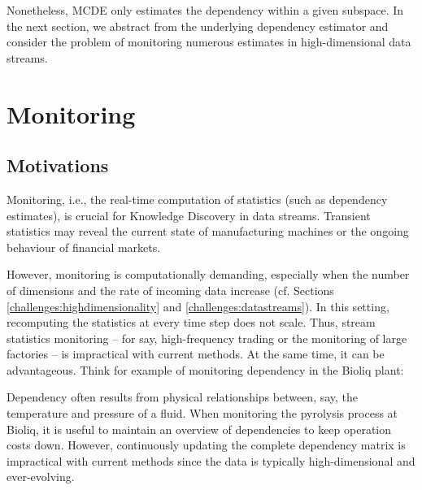 Nonetheless, \gls{MCDE} only estimates the dependency within a given subspace. In the next section, we abstract from the underlying dependency estimator and consider the problem of monitoring numerous estimates in high-dimensional data streams. 

\section{Monitoring}

\subsection{Motivations} 

Monitoring, i.e., the real-time computation of statistics (such as dependency estimates), is crucial for Knowledge Discovery in data streams. Transient statistics may reveal the
current state of manufacturing machines or the ongoing behaviour of financial markets. 

However, monitoring is computationally demanding, especially when the number of dimensions and the rate of incoming data increase (cf. Sections \ref{challenges:highdimensionality} and \ref{challenges:datastreams}). %
In this setting, recomputing the statistics at every time step does not scale. Thus, stream statistics monitoring -- for say, high-frequency trading or the monitoring of large factories -- is impractical with current methods. At the same time, it can be advantageous. Think for example of monitoring dependency in the \gls{Bioliq} plant: 

\begin{example}
	\label{bandit:runningexample}
	Dependency often results from physical relationships between, say, the temperature and pressure of a fluid. 
	When monitoring the pyrolysis process at \gls{Bioliq}, it is useful to maintain an overview of dependencies to keep operation costs down.  
	However, continuously updating the complete dependency matrix is impractical with current methods since the data is typically high-dimensional and ever-evolving. 
\end{example}

